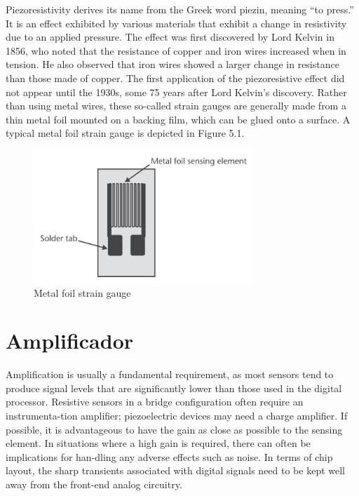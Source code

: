 Piezoresistivity derives its name from the Greek word piezin, meaning “to press.” It is an effect exhibited by various materials that exhibit a change in resistivity due to an applied pressure. The effect was first discovered by Lord Kelvin in 1856, who noted that the resistance of copper and iron wires increased when in tension. He also observed that iron wires showed a larger change in resistance than those made of copper. The first application of the piezoresistive effect did not appear until the 1930s, some 75 years after Lord Kelvin’s discovery. Rather than using metal wires, these so-called strain gauges are generally made from a thin metal foil mounted on a backing film, which can be glued onto a surface. A typical metal foil strain gauge is depicted in Figure 5.1. \cite{book-9}
\begin{figure}[H]
	\centering
	\includegraphics[height=5cm]{./image/PESTA/general/strain_gauge_1.jpg}
	\caption{Metal foil strain gauge \cite{book-9}}
	\label{strain_gauge_1}
\end{figure}

\section*{Amplificador}
Amplification is usually a fundamental requirement, as most sensors tend to
produce signal levels that are significantly lower than those used in the digital processor. Resistive sensors in a bridge configuration often require an instrumenta-tion amplifier; piezoelectric devices may need a charge amplifier. If possible, it is advantageous to have the gain as close as possible to the sensing element. In situations where a high gain is required, there can often be implications for han-dling any adverse effects such as noise. In terms of chip layout, the sharp transients associated with digital signals need to be kept well away from the front-end analog circuitry. \cite{book-9}

